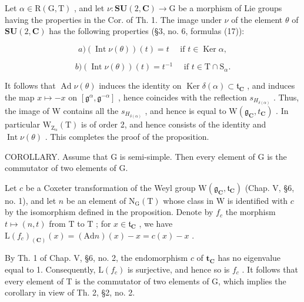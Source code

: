 Let \(\alpha \in \mathrm{R}(\mathrm{G},\mathrm{T})\) , and let \(\nu : \mathbf{SU}(2,\mathbf{C}) \to \mathrm{G}\) be a morphism of Lie groups having the properties in the Cor. of Th. 1. The image under \(\nu\) of the element \(\theta\) of \(\mathbf{SU}(2,\mathbf{C})\) has the following properties (§3, no. 6, formulas (17)):

\[
a) (\operatorname{Int} \nu (\theta)) (t) = t \quad \text { if } t \in \operatorname{Ker} \alpha ,
\]

\[
b) (\operatorname{Int} \nu (\theta)) (t) = t ^ {- 1} \quad \text { if } t \in \mathrm{T} \cap \mathrm{S} _ {\alpha}.
\]

It follows that \(\operatorname{Ad}\nu(\theta)\) induces the identity on \(\operatorname{Ker}\delta(\alpha)\subset\mathfrak{t}_{\mathbf{C}}\) , and induces the map \(x\mapsto-x\) on \([\mathfrak{g}^{\alpha},\mathfrak{g}^{-\alpha}]\) , hence coincides with the reflection \(s_{H_{\delta(\alpha)}}\) . Thus, the image of W contains all the \(s_{H_{\delta(\alpha)}}\) , and hence is equal to \(\mathrm{W}(\mathfrak{g}_{\mathbf{C}}, t_{\mathbf{C}})\) . In particular \(\mathrm{W}_{\mathrm{Z}_{\alpha}}(\mathrm{T})\) is of order 2, and hence consists of the identity and \(\operatorname{Int}\nu(\theta)\) . This completes the proof of the proposition.

COROLLARY. Assume that G is semi-simple. Then every element of G is the commutator of two elements of G.

Let \(c\) be a Coxeter transformation of the Weyl group \(\mathrm{W}(\mathfrak{g}_{\mathbf{C}},\mathfrak{t}_{\mathbf{C}})\) (Chap. V, §6, no. 1), and let \(n\) be an element of \(\mathrm{N}_{\mathrm{G}}(\mathrm{T})\) whose class in \(\mathrm{W}\) is identified with \(c\) by the isomorphism defined in the proposition. Denote by \(f_{c}\) the morphism \(t\mapsto (n,t)\) from \(\mathrm{T}\) to \(\mathrm{T}\) ; for \(x\in \mathfrak{t}_{\mathbf{C}}\) , we have \(\mathrm{L}(f_c)_{(\mathbf{C})}(x) = (\mathrm{Ad}n)(x) - x = c(x) - x\) .

By Th. 1 of Chap. V, §6, no. 2, the endomorphism \(c\) of \(\mathbf{t}_{\mathbf{C}}\) has no eigenvalue equal to 1. Consequently, \(\mathrm{L}(f_c)\) is surjective, and hence so is \(f_c\) . It follows that every element of T is the commutator of two elements of G, which implies the corollary in view of Th. 2, §2, no. 2.

